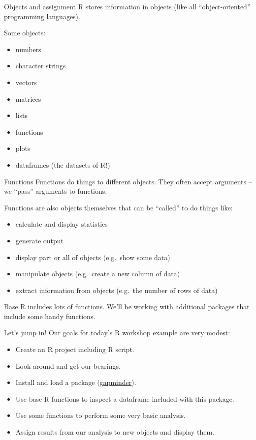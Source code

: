 \documentclass[
  8pt,
  ignorenonframetext,
  dvipsnames]{beamer}
\providecommand{\tightlist}{%
  \setlength{\itemsep}{0pt}\setlength{\parskip}{0pt}}
\let\olditem\item
\renewcommand{\item}{%
  \olditem\vspace{4pt}
}
\begin{document}
\begin{frame}{Objects and assignment}
\protect\hypertarget{objects-and-assignment}{}
R stores information in objects (like all ``object-oriented''
programming languages).

Some objects:

\begin{itemize}
\tightlist
\item
  numbers
\item
  character strings
\item
  vectors
\item
  matrices
\item
  lists
\item
  functions
\item
  plots
\item
  dataframes (the datasets of R!)
\end{itemize}
\end{frame}

\begin{frame}{Functions}
\protect\hypertarget{functions}{}
Functions do things to different objects. They often accept arguments --
we ``pass'' arguments to functions.

Functions are also objects themselves that can be ``called'' to do
things like:

\begin{itemize}
\tightlist
\item
  calculate and display statistics
\item
  generate output
\item
  display part or all of objects (e.g.~show some data)
\item
  manipulate objects (e.g.~create a new column of data)
\item
  extract information from objects (e.g.~the number of rows of data)
\end{itemize}

Base R includes lots of functions. We'll be working with additional
packages that include some handy functions.
\end{frame}

\begin{frame}{Let's jump in!}
\protect\hypertarget{lets-jump-in}{}
Our goals for today's R workshop example are very modest:

\begin{itemize}
\tightlist
\item
  Create an R project including R script.
\item
  Look around and get our bearings.
\item
  Install and load a package
  (\href{https://www.gapminder.org/}{gapminder}).
\item
  Use base R functions to inspect a dataframe included with this
  package.
\item
  Use some functions to perform some very basic analysis.
\item
  Assign results from our analysis to new objects and display them.
\end{itemize}
\end{frame}
\end{document}

